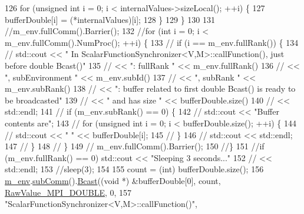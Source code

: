 \begin{DoxyCode}
126           \textcolor{keywordflow}{for} (\textcolor{keywordtype}{unsigned} \textcolor{keywordtype}{int} i = 0; i < internalValues->sizeLocal(); ++i) \{
127             bufferDouble[i] = (*internalValues)[i];
128           \}
129         \}
130 
131         \textcolor{comment}{//m\_env.fullComm().Barrier();}
132         \textcolor{comment}{//for (int i = 0; i < m\_env.fullComm().NumProc(); ++i) \{}
133         \textcolor{comment}{//  if (i == m\_env.fullRank()) \{}
134         \textcolor{comment}{//    std::cout << " In ScalarFunctionSynchronizer<V,M>::callFunction(), just before double
       Bcast()"}
135         \textcolor{comment}{//              << ": fullRank "       << m\_env.fullRank()}
136         \textcolor{comment}{//              << ", subEnvironment " << m\_env.subId()}
137         \textcolor{comment}{//              << ", subRank "        << m\_env.subRank()}
138         \textcolor{comment}{//              << ": buffer related to first double Bcast() is ready to be broadcasted"}
139         \textcolor{comment}{//              << " and has size "      << bufferDouble.size()}
140         \textcolor{comment}{//              << std::endl;}
141         \textcolor{comment}{//    if (m\_env.subRank() == 0) \{}
142   \textcolor{comment}{//      std::cout << "Buffer contents are";}
143         \textcolor{comment}{//      for (unsigned int i = 0; i < bufferDouble.size(); ++i) \{}
144   \textcolor{comment}{//        std::cout << " " << bufferDouble[i];}
145         \textcolor{comment}{//    \}}
146   \textcolor{comment}{//      std::cout << std::endl;}
147         \textcolor{comment}{//    \}}
148         \textcolor{comment}{//  \}}
149         \textcolor{comment}{//  m\_env.fullComm().Barrier();}
150         \textcolor{comment}{//\}}
151         \textcolor{comment}{//if (m\_env.fullRank() == 0) std::cout << "Sleeping 3 seconds..."}
152         \textcolor{comment}{//                                 << std::endl;}
153         \textcolor{comment}{//sleep(3);}
154 
155         count = (int) bufferDouble.size();
156         \hyperlink{class_q_u_e_s_o_1_1_scalar_function_synchronizer_aa77a3d3b53267ef7c731836faaa082fb}{m\_env}.\hyperlink{class_q_u_e_s_o_1_1_base_environment_affe39f53e3d5d678842413370af09145}{subComm}().\hyperlink{class_q_u_e_s_o_1_1_mpi_comm_abd6af8db8b0c7fd2f5b62e26477a9537}{Bcast}((\textcolor{keywordtype}{void} *) &bufferDouble[0], count, 
      \hyperlink{_mpi_comm_8h_ad0f503bd9fecfe4e570ca3d15aaf2518}{RawValue\_MPI\_DOUBLE}, 0,
157                               \textcolor{stringliteral}{"ScalarFunctionSynchronizer<V,M>::callFunction()"},

\end{DoxyCode}
